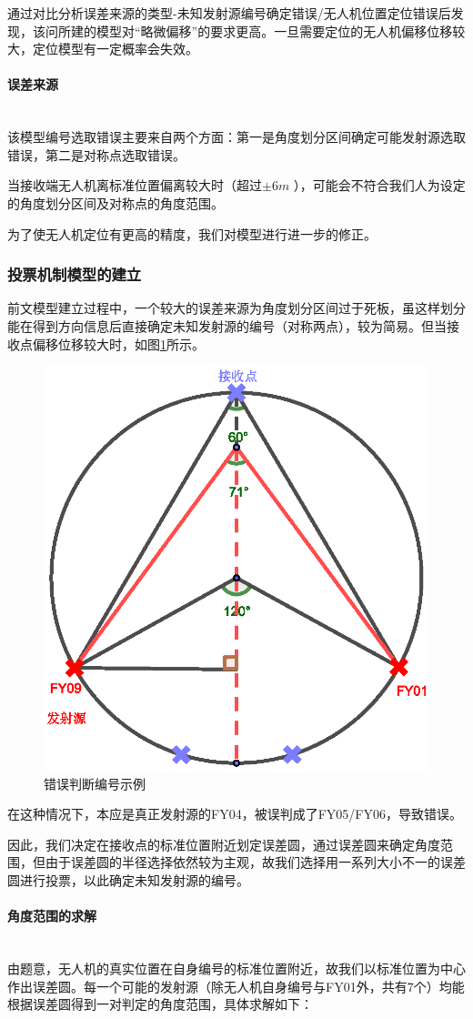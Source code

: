 \documentclass{ctexart}
\newcommand{\subsubsubsection}[1]{\paragraph{#1}\mbox{}\\}
\begin{document}
  通过对比分析误差来源的类型-未知发射源编号确定错误/无人机位置定位错误后发现，该问所建的模型对“略微偏移”的要求更高。一旦需要定位的无人机偏移位移较大，定位模型有一定概率会失效。

  \subsubsubsection{误差来源}

  该模型编号选取错误主要来自两个方面：第一是角度划分区间确定可能发射源选取错误，第二是对称点选取错误。

  当接收端无人机离标准位置偏离较大时（超过$\pm 6m$ ），可能会不符合我们人为设定的角度划分区间及对称点的角度范围。

  为了使无人机定位有更高的精度，我们对模型进行进一步的修正。

  \subsubsection{投票机制模型的建立}

  前文模型建立过程中，一个较大的误差来源为角度划分区间过于死板，虽这样划分能在得到方向信息后直接确定未知发射源的编号（对称两点），较为简易。但当接收点偏移位移较大时，如图\ref{错误判断编号示例}所示。
  
  \begin{figure}[htbp]
    \centering
    \includegraphics[width=0.35\linewidth]{pic/error.eps}
    \caption{错误判断编号示例}
    \label{错误判断编号示例}
    \end{figure}


  在这种情况下，本应是真正发射源的FY04，被误判成了FY05/FY06，导致错误。
  
  因此，我们决定在接收点的标准位置附近划定误差圆，通过误差圆来确定角度范围，但由于误差圆的半径选择依然较为主观，故我们选择用一系列大小不一的误差圆进行投票，以此确定未知发射源的编号。


  \subsubsubsection{角度范围的求解}

  由题意，无人机的真实位置在自身编号的标准位置附近，故我们以标准位置为中心作出误差圆。每一个可能的发射源（除无人机自身编号与FY01外，共有7个）均能根据误差圆得到一对判定的角度范围，具体求解如下：
\end{document}
